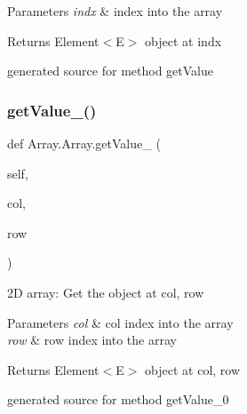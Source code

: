 \begin{DoxyParams}{Parameters}
{\em indx} & index into the array \\
\hline
\end{DoxyParams}
\begin{DoxyReturn}{Returns}
Element$<$\+E$>$ object at \textquotesingle{}indx\textquotesingle{}\begin{DoxyVerb}generated source for method getValue \end{DoxyVerb}
 
\end{DoxyReturn}
\hypertarget{class_array_1_1_array_a54ece61c6a603ad0dd4c424da2930246}{}\label{class_array_1_1_array_a54ece61c6a603ad0dd4c424da2930246} 
\subsubsection{\texorpdfstring{get\+Value\+\_()}{getValue\_0()}}
{\footnotesize\ttfamily def Array.\+Array.\+get\+Value\+\_ (\begin{DoxyParamCaption}\item[{}]{self,  }\item[{}]{col,  }\item[{}]{row }\end{DoxyParamCaption})}



2D array\+: Get the object at \textquotesingle{}col, row\textquotesingle{} 


\begin{DoxyParams}{Parameters}
{\em col} & col index into the array \\
\hline
{\em row} & row index into the array\\
\hline
\end{DoxyParams}
\begin{DoxyReturn}{Returns}
Element$<$\+E$>$ object at \textquotesingle{}col, row\textquotesingle{}\begin{DoxyVerb}generated source for method getValue_0 \end{DoxyVerb}
 
\end{DoxyReturn}
\hypertarget{class_array_1_1_array_ace9c0548ff188dcb220b40fc9d87152e}{}\label{class_array_1_1_array_ace9c0548ff188dcb220b40fc9d87152e} 
